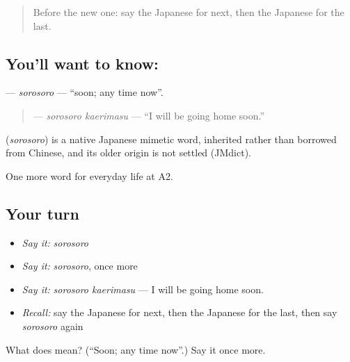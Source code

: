 \label{lesson:JA-C171-sorosoro}



\begin{quote}
Before the new one: say the Japanese for next, then the Japanese for the last.
\end{quote}

\subsection*{You'll want to know: }
\textbf{} — \emph{sorosoro} — \textquotedblleft{}soon; any time now\textquotedblright{}.

\begin{quote}
\textbf{ } — \emph{sorosoro kaerimasu} — \textquotedblleft{}I will be going home soon.\textquotedblright{}
\end{quote}

\begin{cousinweb}
\textbf{} (\emph{sorosoro}) is a native Japanese mimetic word, inherited rather than borrowed from Chinese, and its older origin is not settled (JMdict).
\end{cousinweb}

\begin{grammarlens}[title={What you've built}]
One more word for everyday life at A2.
\end{grammarlens}

\subsection*{Your turn}
\begin{itemize}
\raggedright
  \item \emph{Say it:} \emph{sorosoro}
  \item \emph{Say it:} \emph{sorosoro}, once more
  \item \emph{Say it:} \emph{sorosoro kaerimasu} — I will be going home soon.
  \item \emph{Recall:} say the Japanese for next, then the Japanese for the last, then say \emph{sorosoro} again
\end{itemize}

\begin{tcolorbox}[breakable,colback=teal!4,colframe=teal!35!black,title={Before you move on}]
What does  mean? (\textquotedblleft{}Soon; any time now\textquotedblright{}.) Say it once more.
\end{tcolorbox}
